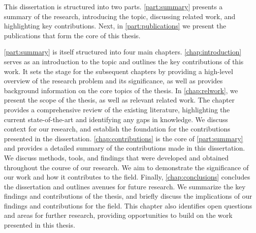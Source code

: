 \medskip

This dissertation is structured into two parts.
\cref{part:summary} presents a summary of the research, introducing the topic, discussing related work, and highlighting key contributions.
Next, in \cref{part:publications} we present the publications that form the core of this thesis.

\cref{part:summary} is itself structured into four main chapters.
\cref{chap:introduction} serves as an introduction to the topic and outlines the key contributions of this work.
It sets the stage for the subsequent chapters by providing a high-level overview of the research problem and its significance, as well as provides background information on the core topics of the thesis.
In \cref{chap:relwork}, we present the scope of the thesis, as well as relevant related work.
The chapter provides a comprehensive review of the existing literature, highlighting the current state-of-the-art and identifying any gaps in knowledge.
We discuss context for our research, and establish the foundation for the contributions presented in the dissertation.
\cref{chap:contributions} is the core of \cref{part:summary} and provides a detailed summary of the contributions made in this dissertation.
We discuss methods, tools, and findings that were developed and obtained throughout the course of our research.
We aim to demonstrate the significance of our work and how it contributes to the field.
Finally, \cref{chap:conclusions} concludes the dissertation and outlines avenues for future research.
We summarize the key findings and contributions of the thesis, and briefly discuss the implications of our findings and contributions for the field.
This chapter also identifies open questions and areas for further research, providing opportunities to build on the work presented in this thesis.